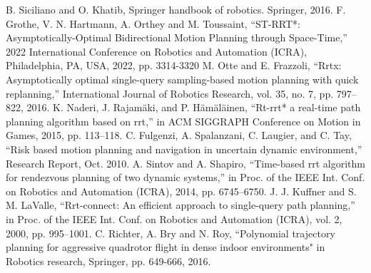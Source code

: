 \documentclass[conference]{IEEEtran}
\begin{document}
    \begin{thebibliography}{00}
         B. Siciliano and O. Khatib, Springer handbook of robotics. Springer, 2016.
         F. Grothe, V. N. Hartmann, A. Orthey and M. Toussaint, ``ST-RRT*: Asymptotically-Optimal Bidirectional Motion Planning through Space-Time,'' 2022 International Conference on Robotics and Automation (ICRA), Philadelphia, PA, USA, 2022, pp. 3314-3320
         M. Otte and E. Frazzoli, ``Rrtx: Asymptotically optimal single-query sampling-based motion planning with quick replanning,'' International Journal of Robotics Research, vol. 35, no. 7, pp. 797–822, 2016.
         K. Naderi, J. Rajamäki, and P. Hämäläinen, ``Rt-rrt* a real-time path planning algorithm based on rrt,'' in ACM SIGGRAPH Conference on Motion in Games, 2015, pp. 113–118.
         C. Fulgenzi, A. Spalanzani, C. Laugier, and C. Tay, ``Risk based motion planning and navigation in uncertain dynamic environment,'' Research Report, Oct. 2010.
         A. Sintov and A. Shapiro, ``Time-based rrt algorithm for rendezvous planning of two dynamic systems,'' in Proc. of the IEEE Int. Conf. on Robotics and Automation (ICRA), 2014, pp. 6745–6750.
         J. J. Kuffner and S. M. LaValle, ``Rrt-connect: An efficient approach to single-query path planning,'' in Proc. of the IEEE Int. Conf. on Robotics and Automation (ICRA), vol. 2, 2000, pp. 995–1001.
         C. Richter, A. Bry and N. Roy, ``Polynomial trajectory planning for aggressive quadrotor flight in dense indoor environments" in Robotics research, Springer, pp. 649-666, 2016.

    \end{thebibliography}
\end{document}
